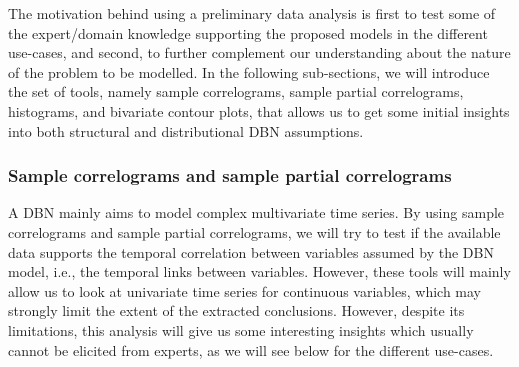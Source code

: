 The motivation behind using a preliminary data analysis is first to test some of the expert/domain knowledge  supporting the proposed models in the different use-cases, and second, to further complement our understanding about the nature of the problem to be modelled. In the following sub-sections, we will introduce the set of tools, namely sample correlograms, sample partial correlograms, histograms, and bivariate contour plots, that allows us to get some initial insights into both structural and distributional DBN assumptions.

\subsubsection{Sample correlograms and sample partial correlograms}

A DBN mainly aims to model complex multivariate time series. By using sample correlograms and sample partial correlograms, we will try to test if the available data supports the temporal correlation between variables assumed by the DBN model, i.e., the temporal links between variables. However, these tools will mainly allow us to look at univariate time series for continuous variables, which may strongly limit the extent of the extracted conclusions. However, despite its limitations, this analysis will give us some interesting insights which usually cannot be elicited from experts, as we will see below for the different use-cases.  

